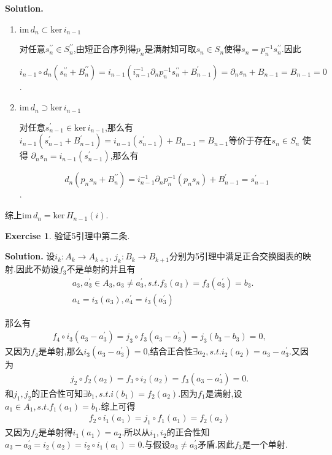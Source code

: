 \documentclass[a4paper]{book}
\newenvironment{solution}%
{\noindent\textbf{Solution.}}%
{\qedhere}
\numberwithin{equation}{chapter}
\theoremstyle{definition}
\newtheorem{exc}[exm]{Exercise}
\begin{document}
\begin{solution}
	\begin{enumerate}
		\item $ \text{im}\, d_n \subset \text{ker}\, i_{n-1} $
		
		对任意$ s^{\prime\prime}_n \in S_n^{\prime\prime} $,由短正合序列得$p_n$是满射知可取$s_n \in S_n$使得$s_n = p^{-1}_{n} s^{\prime \prime}_n$.因此
		
		\[ i_{n-1} \circ d_n(s_n^{\prime \prime} + B^{\prime \prime}_n) = i_{n-1}(i^{-1}_{n-1}\partial_n p^{-1}_n s^{\prime \prime}_n + B^\prime_{n-1}) = \partial_n s_n + B_{n-1} = B_{n-1} = 0\].
		
		\item  $ \text{im}\, d_n \supset \text{ker}\, i_{n-1} $
		
		对任意$ s^\prime_{n-1} \in \text{ker}\, i_{n-1} $,那么有$ i_{n-1}(s^\prime_{n-1} + B^\prime_{n-1}) = i_{n-1}(s^\prime_{n-1}) + B_{n-1} = B_{n-1} $等价于存在$s_n \in S_n$ 使得 $\partial_n s_n = i_{n-1} (s^\prime_{n-1})$,那么有
		
		\[d_n(p_n s_n + B^{\prime\prime}_{n}) = i^{-1}_{n-1} \partial_n p^{-1}_{n} (p_n s_n) + B^\prime_{n-1} = s^\prime_{n-1}\].
	\end{enumerate}
综上$ \text{im}\, d_n = \text{ker}\, H_{n-1}(i) $.
\end{solution}

\begin{exc}
	验证5引理中第二条.
\end{exc}


\begin{solution}
	设$ i_k \colon A_k \rightarrow A_{k+1} $, $ j_k \colon B_k \rightarrow B_{k+1} $分别为5引理中满足正合交换图表的映射.因此不妨设$ f_3 $不是单射的并且有
	\begin{align*} 
	&a_3, a^\prime_3 \in A_3, a_3 \not= a_3^\prime  ,s.t. f_3(a_3) = f_3(a^\prime_3) = b_3. \\
	&a_4 = i_3(a_3), a_4^\prime = i_3(a_3^\prime)
	\end{align*}
	
	那么有 
	\begin{align*}
	f_4 \circ i_3(a_3 - a_3^\prime) = j_3 \circ f_3(a_3 - a_3^\prime) = j_3(b_3 - b_3) = 0,
	\end{align*}
	又因为$ f_4 $是单射,那么$ i_3(a_3 - a_3^\prime) = 0 $,结合正合性$ \exists a_2,s.t. i_2(a_2) = a_3 - a_3^\prime $.又因为
	\begin{align*}
		j_2 \circ f_2(a_2) = f_3 \circ i_2(a_2) = f_3(a_3 - a_3^\prime) = 0.
	\end{align*}
	和$ j_1,j_2 $的正合性可知$ \exists b_1,s.t. i(b_1) = f_2(a_2) $.因为$ f_1 $是满射,设$ a_1 \in A_1,s.t. f_1(a_1) = b_1 $.综上可得
	\begin{align*}
		f_2 \circ i_1(a_1) = j_1 \circ f_1(a_1) = f_2(a_2)
	\end{align*}
	又因为$ f_2 $是单射得$ i_1(a_1) = a_2 $.所以从$ i_1,i_2 $的正合性知$ a_3 - a_3^\prime = i_2(a_2) = i_2 \circ i_1(a_1) = 0 $.与假设$ a_3 \not= a_3^\prime $矛盾.因此$ f_3 $是一个单射.
\end{solution}
\end{document}
